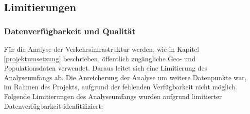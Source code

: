 


\subsection{Limitierungen}\label{limitierung}
\subsubsection{Datenverfügbarkeit und Qualität}
Für die Analyse der Verkehrsinfrastruktur werden, wie in Kapitel \ref{projektumsetzung} beschrieben, öffentlich zugängliche Geo- und Populationsdaten verwendet. Daraus leitet sich eine Limitierung des Analyseumfangs ab. Die Anreicherung der Analyse um weitere Datenpunkte war, im Rahmen des Projekts, aufgrund der fehlenden Verfügbarkeit nicht möglich. Folgende Limitierungen des Analyseumfangs wurden aufgrund limitierter Datenverfügbarkeit idenfitifiziert:


